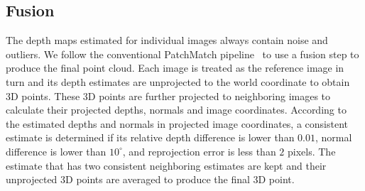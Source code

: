 \documentclass[letterpaper]{article} %
\begin{document}
\subsection{Fusion} 

The depth maps estimated for individual images always contain noise and outliers. We follow the conventional PatchMatch pipeline~\cite{Schonberger2016Pixelwise,Xu2018Multi} to use a fusion step to produce the final point cloud. Each image is treated as the reference image in turn and its depth estimates are unprojected to the world coordinate to obtain 3D points. These 3D points are further projected to neighboring images to calculate their projected depths, normals and image coordinates. According to the estimated depths and normals in projected image coordinates, a consistent estimate is determined if its relative depth difference is lower than $0.01$, normal difference is lower than $10^\circ$, and reprojection error is less than $2$ pixels. The estimate that has two consistent neighboring estimates are kept and their unprojected 3D points are averaged to produce the final 3D point. 
\end{document}
